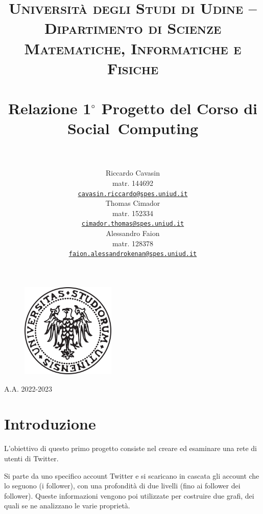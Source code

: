\documentclass[a4paper, 11pt, twoside]{article}
\title{
    \vspace{-50pt}
    \textsc{Università degli Studi di Udine -- Dipartimento di Scienze Matematiche, Informatiche e Fisiche} \\ 
    \vfill
    \horrule{1pt}\\
    \huge{Relazione 1$^{\circ}$ Progetto del Corso di Social~Computing}\\
    \horrule{1pt}\\
    \vfill
    }
\author{ %
    Riccardo Cavasin\\ 
    matr. 144692\\ 
    \vspace{18pt}
    \href{mailto:cavasin.riccardo@spes.uniud.it}{\texttt{cavasin.riccardo@spes.uniud.it}}\\
    Thomas Cimador\\ 
    matr. 152334\\ 
    \vspace{18pt}
    \href{mailto:cimador.thomas@spes.uniud.it}{\texttt{cimador.thomas@spes.uniud.it}}\\
    Alessandro Faion\\ 
    matr. 128378\\ 
    \vspace{18pt}
    \href{mailto:faion.alessandrokenan@spes.uniud.it}{\texttt{faion.alessandrokenan@spes.uniud.it}}\\
}
\date{}
\begin{document}
\begin{titlepage}
    \begin{figure}[t]
        \includegraphics[width=4.5cm, height=4.5cm]{uniud_logo.png}
        \centering
    \end{figure}
    \maketitle
    \vfill
    \begin{center}
        \large{A.A. 2022-2023}
    \end{center}
    \thispagestyle{empty}
\end{titlepage}

\tableofcontents
\thispagestyle{empty}  %
\newpage               %
\setcounter{page}{1}   %

\section{Introduzione}\label{sec:intro}
L'obiettivo di questo primo progetto consiste nel creare ed esaminare una rete di utenti di Twitter.

Si parte da uno specifico account Twitter e si scaricano in cascata gli account che lo seguono (i follower), con una profondità di due livelli (fino ai follower dei follower). Queste informazioni vengono poi utilizzate per costruire due grafi, dei quali se ne analizzano le varie proprietà.
\end{document}
